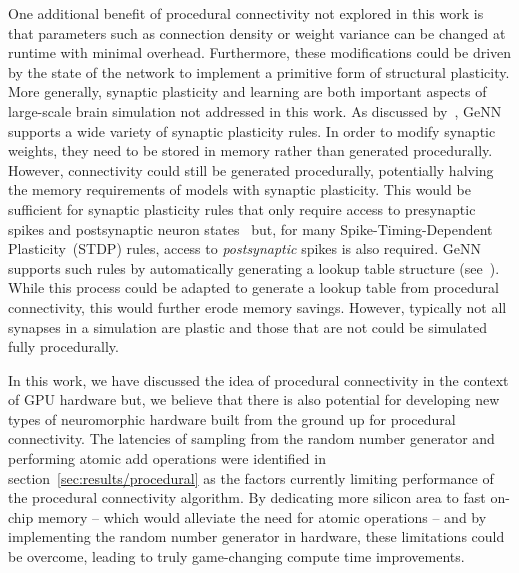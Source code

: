 \documentclass[9pt,a4paper]{amsart}
\begin{document}
One additional benefit of procedural connectivity not explored in this work is that parameters such as connection density or weight variance can be changed at runtime with minimal overhead.
Furthermore, these modifications could be driven by the state of the network to implement a primitive form of structural plasticity.
More generally, synaptic plasticity and learning are both important aspects of large-scale brain simulation not addressed in this work.
As discussed by~\citet{Knight2018}, GeNN supports a wide variety of synaptic plasticity rules.
In order to modify synaptic weights, they need to be stored in memory rather than generated procedurally.
However, connectivity could still be generated procedurally, potentially halving the memory requirements of models with synaptic plasticity.
This would be sufficient for synaptic plasticity rules that only require access to presynaptic spikes and postsynaptic neuron states~\citep{Brader2007,Clopath2010c} but, for many Spike-Timing-Dependent Plasticity~(STDP) rules, access to \emph{postsynaptic} spikes is also required.
GeNN supports such rules by automatically generating a lookup table structure (see~\citet{Knight2018}).
While this process could be adapted to generate a lookup table from procedural connectivity, this would further erode memory savings.
However, typically not all synapses in a simulation are plastic and those that are not could be simulated fully procedurally.

In this work, we have discussed the idea of procedural connectivity in the context of GPU hardware but, we believe that there is also potential for developing new types of neuromorphic hardware built from the ground up for procedural connectivity.
The latencies of sampling from the random number generator and performing atomic add operations were identified in section~\ref{sec:results/procedural} as the factors currently limiting performance of the procedural connectivity algorithm.
By dedicating more silicon area to fast on-chip memory -- which would alleviate the need for atomic operations -- and by implementing the random number generator in hardware, these limitations could be overcome, leading to truly game-changing compute time improvements.
%
\end{document}
